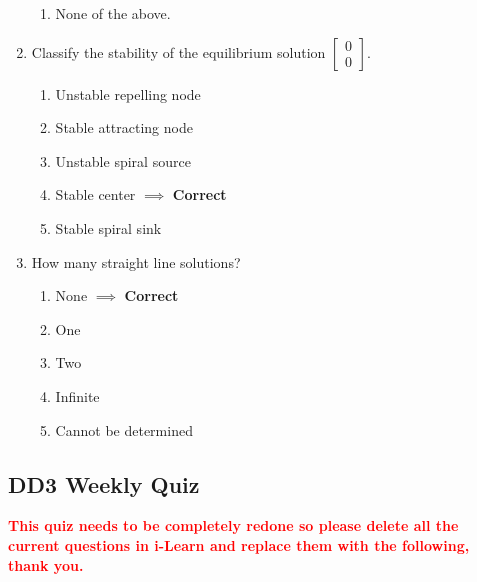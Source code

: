 \documentclass[11pt]{article}
\begin{document}
\begin{enumerate}
\begin{enumerate}
		\item None of the above.
	\end{enumerate}
	\item Classify the stability of the equilibrium solution $\begin{bmatrix}0\\0 \end{bmatrix}$.
	\begin{enumerate}
		\item Unstable repelling node
		\item Stable attracting node
		\item Unstable spiral source
		\item Stable center $\implies$ \textbf{Correct}
		\item Stable spiral sink
	\end{enumerate}
	\item How many straight line solutions?
	\begin{enumerate}
		\item None $\implies$ \textbf{Correct}
		\item One
		\item Two
		\item Infinite
		\item Cannot be determined
	\end{enumerate}
\end{enumerate}

\subsection*{DD3 Weekly Quiz}
	\textbf{\textcolor{red}{This quiz needs to be completely redone so please delete all the current questions in i-Learn and replace them with the following, thank you.}}
		
\end{document}
